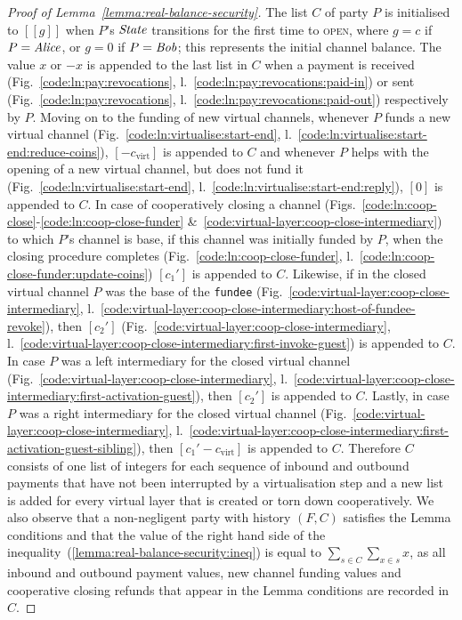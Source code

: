 \begin{proof}[Proof of Lemma~\ref{lemma:real-balance-security}]
  The list $C$ of party $P$ is initialised to $[[g]]$ when $P$'s $\itistate$
  transitions for the first time to \textsc{open}, where $g = c$ if $P =
  \mathit{Alice}$, or $g = 0$ if $P = \mathit{Bob}$; this represents the initial channel
  balance. The value $x$ or $-x$ is appended to the last list in $C$ when a
  payment is received (Fig.~\ref{code:ln:pay:revocations},
  l.~\ref{code:ln:pay:revocations:paid-in}) or sent
  (Fig.~\ref{code:ln:pay:revocations},
  l.~\ref{code:ln:pay:revocations:paid-out}) respectively by $P$. Moving on to
  the funding of new virtual channels, whenever $P$ funds a new virtual channel
  (Fig.~\ref{code:ln:virtualise:start-end},
  l.~\ref{code:ln:virtualise:start-end:reduce-coins}), $[-c_{\mathrm{virt}}]$
  is appended to $C$ and whenever $P$ helps with the opening of a new virtual
  channel, but does not fund it (Fig.~\ref{code:ln:virtualise:start-end},
  l.~\ref{code:ln:virtualise:start-end:reply}), $[0]$ is appended to $C$.
  In case of cooperatively closing a channel
  (Figs.~\ref{code:ln:coop-close}-\ref{code:ln:coop-close-funder}
  \&~\ref{code:virtual-layer:coop-close-intermediary}) to which $P$'s channel is
  base, if this channel was initially funded by $P$, when the closing procedure
  completes (Fig.~\ref{code:ln:coop-close-funder},
  l.~\ref{code:ln:coop-close-funder:update-coins}) $[c_1']$ is appended to $C$.
  Likewise, if in the closed virtual channel $P$ was the base of the
  \texttt{fundee} (Fig.~\ref{code:virtual-layer:coop-close-intermediary},
  l.~\ref{code:virtual-layer:coop-close-intermediary:host-of-fundee-revoke}),
  then $[c_2']$ (Fig.~\ref{code:virtual-layer:coop-close-intermediary},
  l.~\ref{code:virtual-layer:coop-close-intermediary:first-invoke-guest}) is
  appended to $C$. In case $P$ was a left intermediary for the closed virtual
  channel (Fig.~\ref{code:virtual-layer:coop-close-intermediary},
  l.~\ref{code:virtual-layer:coop-close-intermediary:first-activation-guest}),
  then $[c_2']$ is appended to $C$.
  Lastly, in case $P$ was a right intermediary for the closed
  virtual channel (Fig.~\ref{code:virtual-layer:coop-close-intermediary},
  l.~\ref{code:virtual-layer:coop-close-intermediary:first-activation-guest-sibling}),
  then $[c_1' - c_{\mathrm{virt}}]$ is appended to $C$. Therefore $C$ consists
  of one list of integers for each sequence of inbound and outbound payments
  that have not been interrupted by a virtualisation step and a new list is
  added for every virtual layer that is created or torn down cooperatively. We
  also observe that a non-negligent party with history $(F, C)$ satisfies the
  Lemma conditions and that the value of the right hand side of the
  inequality~(\ref{lemma:real-balance-security:ineq}) is equal to
  $\sum\limits_{s \in C} \sum\limits_{x \in s} x$, as all inbound and outbound
  payment values, new channel funding values and cooperative closing refunds
  that appear in the Lemma conditions are recorded in $C$.


\end{proof}
